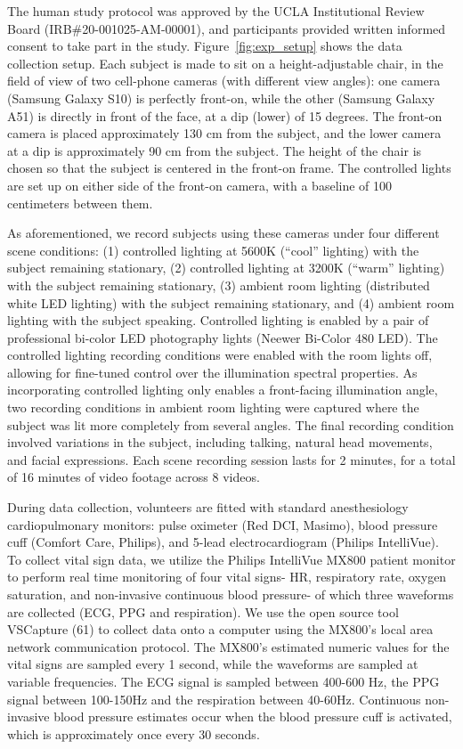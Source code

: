 The human study protocol was approved by the UCLA Institutional Review Board (IRB\#20-001025-AM-00001), and participants provided written informed consent to take part in the study. Figure~\ref{fig:exp_setup} shows the data collection setup. Each subject is made to sit on a height-adjustable chair, in the field of view of two cell-phone cameras (with different view angles): one camera (Samsung Galaxy S10) is perfectly front-on, while the other (Samsung Galaxy A51) is directly in front of the face, at a dip (lower) of 15 degrees. The front-on camera is placed approximately 130 cm from the subject, and the lower camera at a dip is approximately 90 cm from the subject. The height of the chair is chosen so that the subject is centered in the front-on frame. The controlled lights are set up on either side of the front-on camera, with a baseline of 100 centimeters between them.

As aforementioned, we record subjects using these cameras under four different scene conditions: (1) controlled lighting at 5600K (“cool” lighting) with the subject remaining stationary, (2) controlled lighting at 3200K (“warm” lighting) with the subject remaining stationary, (3) ambient room lighting (distributed white LED lighting) with the subject remaining stationary, and (4) ambient room lighting with the subject speaking. Controlled lighting is enabled by a pair of professional bi-color LED photography lights (Neewer Bi-Color 480 LED). The controlled lighting recording conditions were enabled with the room lights off, allowing for fine-tuned control over the illumination spectral properties. As incorporating controlled lighting only enables a front-facing illumination angle, two recording conditions in ambient room lighting were captured where the subject was lit more completely from several angles. The final recording condition involved variations in the subject, including talking, natural head movements, and facial expressions. Each scene recording session lasts for 2 minutes, for a total of 16 minutes of video footage across 8 videos. 

During data collection, volunteers are fitted with standard anesthesiology cardiopulmonary monitors: pulse oximeter (Red DCI, Masimo), blood pressure cuff (Comfort Care, Philips), and 5-lead electrocardiogram (Philips IntelliVue). To collect vital sign data, we utilize the Philips IntelliVue MX800 patient monitor to perform real time monitoring of four vital signs- HR, respiratory rate, oxygen saturation, and non-invasive continuous blood pressure- of which three waveforms are collected (ECG, PPG and respiration). We use the open source tool VSCapture (61) to collect data onto a computer using the MX800’s local area network communication protocol. The MX800’s estimated numeric values for the vital signs are sampled every 1 second, while the waveforms are sampled at variable frequencies. The ECG signal is sampled between 400-600 Hz, the PPG signal between 100-150Hz and the respiration between 40-60Hz.  Continuous non-invasive blood pressure estimates occur when the blood pressure cuff is activated, which is approximately once every 30 seconds. 

